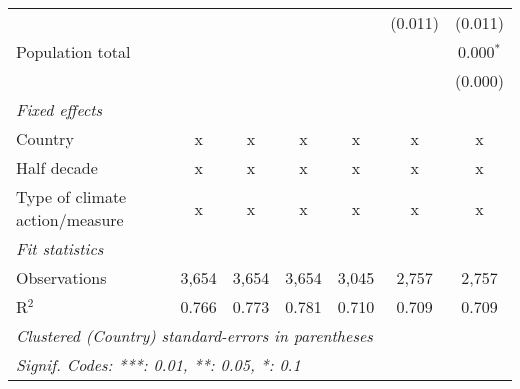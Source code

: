 \begin{tabular}{lcccccc}
                                                                               &               &               &               &                & (0.011)        & (0.011)\\   
   Population total                                                            &               &               &               &                &                & 0.000$^{*}$\\   
                                                                               &               &               &               &                &                & (0.000)\\   
   \emph{Fixed effects}\\
   Country                                                                     & x             & x             & x             & x              & x              & x\\  
   Half decade                                                                 & x             & x             & x             & x              & x              & x\\  
   Type of climate action/measure                                              & x             & x             & x             & x              & x              & x\\  
   \midrule \emph{Fit statistics}\\
   Observations                                                                & 3,654         & 3,654         & 3,654         & 3,045          & 2,757          & 2,757\\  
   R$^2$                                                                       & 0.766         & 0.773         & 0.781         & 0.710          & 0.709          & 0.709\\  
   \midrule
   \multicolumn{7}{l}{\emph{Clustered (Country) standard-errors in parentheses}}\\
   \multicolumn{7}{l}{\emph{Signif. Codes: ***: 0.01, **: 0.05, *: 0.1}}\\
\end{tabular}
\par\endgroup



